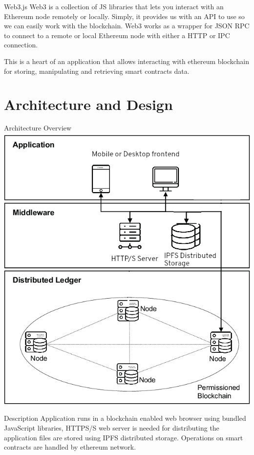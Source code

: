 \documentclass[9pt]{beamer}
\begin{document}
\begin{frame}{Web3.js}
    Web3 is a collection of JS libraries that lets you interact with an Ethereum node remotely or locally. Simply, it provides us with an API to use so we can easily work with the blockchain. Web3 works as a wrapper for JSON RPC to connect to a remote or local Ethereum node with either a HTTP or IPC connection.
    
    This is a heart of an application that allows interacting with ethereum blockchain for storing, manipulating and retrieving smart contracts data.
\end{frame}

\section{Architecture and Design}

\begin{frame}{Architecture Overview}
   \includegraphics{arch}
\end{frame}

\begin{frame}{Description}
   Application runs in a blockchain enabled web browser using bundled JavaScript libraries, HTTPS/S web server is needed for distributing the application files are stored using IPFS distributed storage. Operations on smart contracts are handled by ethereum network.
\end{frame}
\end{document}
